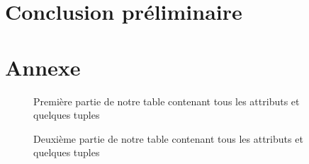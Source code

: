 \documentclass[a4paper,sffamily,12pt]{article}
\begin{document}
		\newpage

		\section{Conclusion préliminaire}

			\vspace{0.5cm}
			
			
			

			\newpage

			\section{Annexe}
							
				\begin{figure}[!h]		
					\centering
					\caption{Première partie de notre table contenant tous les attributs et quelques tuples}
					\label{table_p1}	
				\end{figure}			

				\begin{figure}[!h]
					\centering						
					\caption{Deuxième partie de notre table contenant tous les attributs et quelques tuples}
					\label{table_p2}	
				\end{figure}			
\end{document}
